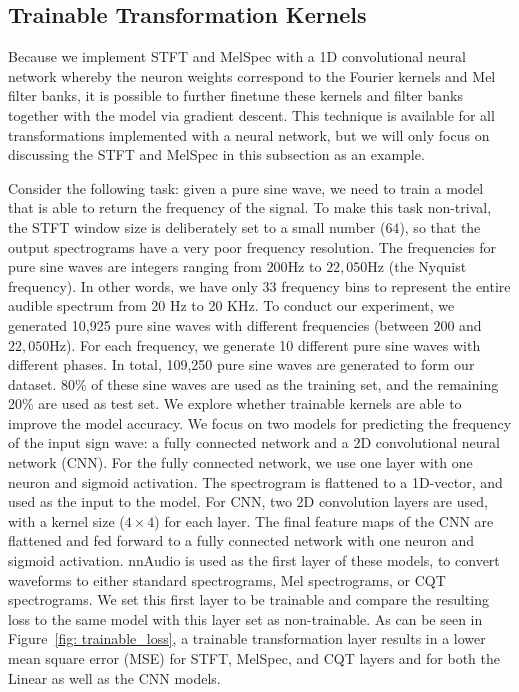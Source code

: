\documentclass{ieeeaccess}
\begin{document}
\subsection{Trainable Transformation Kernels}\label{subsec:trainable}
Because we implement STFT and MelSpec with a 1D convolutional neural network whereby the neuron weights correspond to the Fourier kernels and Mel filter banks, it is possible to further finetune these kernels and filter banks together with the model via gradient descent. This technique is available for all transformations implemented with a neural network, but we will only focus on discussing the STFT and MelSpec in this subsection as an example.

 
Consider the following task: given a pure sine wave, we need to train a model that is able to return the frequency of the signal. To make this task non-trival, the STFT window size is deliberately set to a small number ($64$), so that the output spectrograms have a very poor frequency resolution. The frequencies for pure sine waves are integers ranging from $200$Hz to $22,050$Hz (the Nyquist frequency). In other words, we have only $33$ frequency bins to represent the entire audible spectrum from 20 Hz to 20 KHz. To conduct our experiment, we generated 10,925 pure sine waves with different frequencies (between $200$ and $22,050$Hz). For each frequency, we generate 10 different pure sine waves with different phases. In total, 109,250 pure sine waves are generated to form our dataset. 80\% of these sine waves are used as the training set, and the remaining 20\% are used as test set. We explore whether trainable kernels are able to improve the model accuracy. We focus on two models for predicting the frequency of the input sign wave: a fully connected network and a 2D convolutional neural network (CNN). For the fully connected network, we use one layer with one neuron and sigmoid activation. The spectrogram is flattened to a 1D-vector, and used as the input to the model. For CNN, two 2D convolution layers are used, with a kernel size  ($4\times4$) for each layer. The final feature maps of the CNN are flattened and fed forward to a fully connected network with one neuron and sigmoid activation. nnAudio is used as the first layer of these models, to convert waveforms to either standard spectrograms, Mel spectrograms, or CQT spectrograms. We set this first layer to be trainable and compare the resulting loss to the same model with this layer set as non-trainable. As can be seen in Figure~\ref{fig: trainable_loss}, a trainable transformation layer results in a lower mean square error (MSE) for STFT, MelSpec, and CQT layers and for both the Linear as well as the CNN models.
\end{document}
